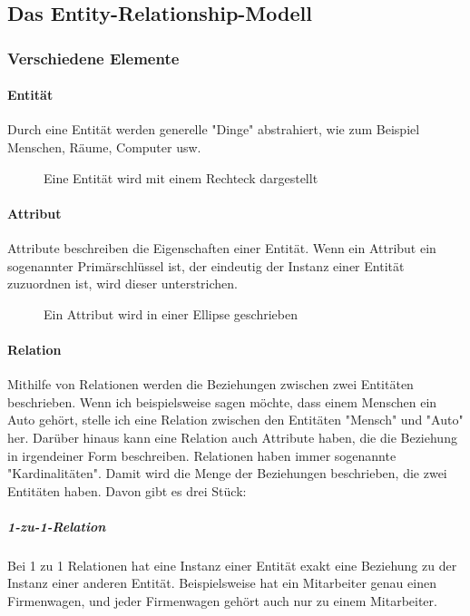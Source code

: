 \documentclass{article}
\begin{document}
	\subsection{Das Entity-Relationship-Modell}
	\subsubsection{Verschiedene Elemente}
	\paragraph{Entität}
	Durch eine Entität werden generelle "Dinge" abstrahiert, wie zum Beispiel Menschen, Räume, Computer usw.

	\begin{figure}[h!]
		\centering
		
		\caption{Eine Entität wird mit einem Rechteck dargestellt}
	\end{figure}	

	\paragraph{Attribut}
	Attribute beschreiben die Eigenschaften einer Entität. Wenn ein Attribut ein sogenannter Primärschlüssel ist, der eindeutig der Instanz einer Entität zuzuordnen ist, wird dieser unterstrichen.

	\begin{figure}[h!]
		\centering
		
		\caption{Ein Attribut wird in einer Ellipse geschrieben}
	\end{figure}	

	\paragraph{Relation}
	Mithilfe von Relationen werden die Beziehungen zwischen zwei Entitäten beschrieben. Wenn ich beispielsweise sagen möchte, dass einem Menschen ein Auto gehört, stelle ich eine Relation zwischen den Entitäten "Mensch" und "Auto" her. Darüber hinaus kann eine Relation auch Attribute haben, die die Beziehung in irgendeiner Form beschreiben.
	Relationen haben immer sogenannte "Kardinalitäten". Damit wird die Menge der Beziehungen beschrieben, die zwei Entitäten haben. Davon gibt es drei Stück:

	\subparagraph{1-zu-1-Relation}
	Bei 1 zu 1 Relationen hat eine Instanz einer Entität exakt eine Beziehung zu der Instanz einer anderen Entität. Beispielsweise hat ein Mitarbeiter genau einen Firmenwagen, und jeder Firmenwagen gehört auch nur zu einem Mitarbeiter.
\end{document}
